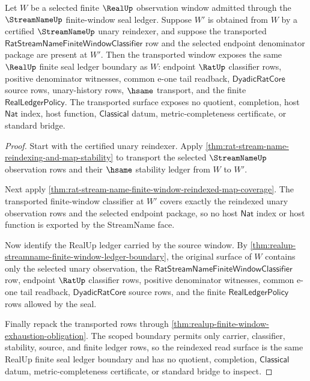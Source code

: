 \begin{theorem}
\label{thm:realup-finite-window-reindexed-classifier-transport}
Let $W$ be a selected finite $\RealUp$ observation window admitted through the
$\StreamNameUp$ finite-window seal ledger. Suppose $W'$ is obtained from $W$
by a certified $\StreamNameUp$ unary reindexer, and suppose the transported
$\mathsf{RatStreamNameFiniteWindowClassifier}$ row and the selected endpoint
denominator package are present at $W'$. Then the transported window exposes
the same $\RealUp$ finite seal ledger boundary as $W$: endpoint $\RatUp$
classifier rows, positive denominator witnesses, common e-one tail readback,
$\mathsf{DyadicRatCore}$ source rows, unary-history rows, $\hsame$ transport,
and the finite $\mathsf{RealLedgerPolicy}$. The transported surface exposes
no quotient, completion, host $\mathsf{Nat}$ index, host function,
$\mathsf{Classical}$ datum, metric-completeness certificate, or standard
bridge.
\end{theorem}
\begin{proof}
Start with the certified unary reindexer. Apply
\autoref{thm:rat-stream-name-reindexing-and-map-stability} to transport the
selected $\StreamNameUp$ observation rows and their $\hsame$ stability ledger
from $W$ to $W'$.

Next apply
\autoref{thm:rat-stream-name-finite-window-reindexed-map-coverage}. The
transported finite-window classifier at $W'$ covers exactly the reindexed
unary observation rows and the selected endpoint package, so no host
$\mathsf{Nat}$ index or host function is exported by the StreamName face.

Now identify the RealUp ledger carried by the source window. By
\autoref{thm:realup-streamname-finite-window-ledger-boundary}, the original
surface of $W$ contains only the selected unary observation, the
$\mathsf{RatStreamNameFiniteWindowClassifier}$ row, endpoint $\RatUp$
classifier rows, positive denominator witnesses, common e-one tail readback,
$\mathsf{DyadicRatCore}$ source rows, and the finite
$\mathsf{RealLedgerPolicy}$ rows allowed by the seal.

Finally repack the transported rows through
\autoref{thm:realup-finite-window-exhaustion-obligation}. The scoped boundary
permits only carrier, classifier, stability, source, and finite ledger rows,
so the reindexed read surface is the same RealUp finite seal ledger boundary
and has no quotient, completion, $\mathsf{Classical}$ datum,
metric-completeness certificate, or standard bridge to inspect.
\end{proof}

